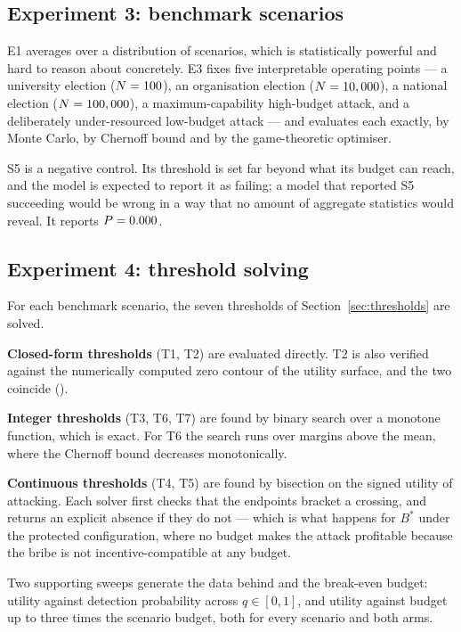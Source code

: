 \subsection{Experiment 3: benchmark scenarios}
\label{sec:exp-three}

E1 averages over a distribution of scenarios, which is statistically
powerful and hard to reason about concretely. E3 fixes five
interpretable operating points --- a university election ($N = 100$),
an organisation election ($N = 10,000$), a national election
($N = 100,000$), a maximum-capability high-budget attack, and a
deliberately under-resourced low-budget attack --- and evaluates each
exactly, by Monte Carlo, by Chernoff bound and by the game-theoretic
optimiser.

S5 is a negative control. Its threshold is set far beyond what its
budget can reach, and the model is expected to report it as failing; a
model that reported S5 succeeding would be wrong in a way that no
amount of aggregate statistics would reveal. It reports
$P = 0.000$.

\subsection{Experiment 4: threshold solving}
\label{sec:exp-four}

For each benchmark scenario, the seven thresholds of
Section~\ref{sec:thresholds} are solved.

\textbf{Closed-form thresholds} (T1, T2) are evaluated directly. T2 is
also verified against the numerically computed zero contour of the
utility surface, and the two coincide ().

\textbf{Integer thresholds} (T3, T6, T7) are found by binary search
over a monotone function, which is exact. For T6 the search runs over
margins above the mean, where the Chernoff bound decreases
monotonically.

\textbf{Continuous thresholds} (T4, T5) are found by bisection on the
signed utility of attacking. Each solver first checks that the endpoints
bracket a crossing, and returns an explicit absence if they do not ---
which is what happens for $B^*$ under the protected configuration,
where no budget makes the attack profitable because the bribe is not
incentive-compatible at any budget.

Two supporting sweeps generate the data behind 
and the break-even budget: utility against detection probability across
$q \in [0, 1]$, and utility against budget up to three times the
scenario budget, both for every scenario and both arms.

